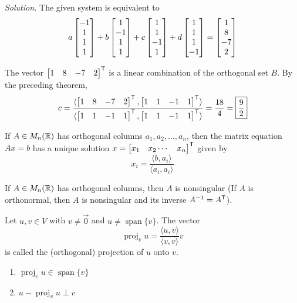 \begin{example}
\begin{enumerate}
    \textit{Solution.} The given system is equivalent to 
    $$a\begin{bmatrix} -1 \\ 1 \\ 1 \\ 1 \end{bmatrix} + b\begin{bmatrix} 1 \\ -1 \\ 1 \\ 1 \end{bmatrix} + c\begin{bmatrix} 1 \\ 1 \\ -1 \\ 1 \end{bmatrix} + d\begin{bmatrix} 1 \\ 1 \\ 1 \\ -1 \end{bmatrix} = \begin{bmatrix} 1 \\ 8 \\ -7 \\ 2 \end{bmatrix}$$

    The vector $\begin{bmatrix} 1 & 8 & -7 &2 \end{bmatrix}^{\mathsf{T}}$ is a linear combination of the orthogonal set $B$. By the preceding theorem,
    $$c = \frac{\langle\begin{bmatrix} 1 & 8 & -7 & 2 \end{bmatrix}^{\mathsf{T}}, \begin{bmatrix} 1 & 1 & -1 & 1 \end{bmatrix}^{\mathsf{T}}\rangle}{\langle\begin{bmatrix} 1 & 1 & -1 & 1 \end{bmatrix}^{\mathsf{T}}, \begin{bmatrix} 1 & 1 & -1 & 1 \end{bmatrix}^{\mathsf{T}}\rangle} = \frac{18}{4} = \boxed{\frac{9}{2}}$$
\end{enumerate}
\end{example}

\begin{remark}
If $A \in M_n(\mathbb{R})$ has orthogonal columns $a_1, a_2, \dots, a_n$, then the matrix equation $Ax = b$ has a unique solution $x = \begin{bmatrix} x_1 & x_2 \cdots & x_n \end{bmatrix}^{\mathsf{T}}$ given by
$$x_i = \frac{\langle b, a_i\rangle}{\langle a_i, a_i \rangle}$$
\end{remark}

\begin{theorem}
If $A \in M_n(\mathbb{R})$ has orthogonal columns, then $A$ is nonsingular (If $A$ is orthonormal, then $A$ is nonsingular and its inverse $A^{-1} = A^{\mathsf{T}}$).
\end{theorem}

\begin{definition}
Let $u, v \in V$ with $v \neq \vec{0}$ and $u \neq \operatorname{span}\{v\}$. The vector
$$\operatorname{proj}_vu = \frac{\langle u, v \rangle}{\langle v, v \rangle}v$$
is called the (orthogonal) projection of $u$ onto $v$.
\end{definition}

\begin{remark}
\leavevmode
\begin{enumerate}
    \item $\operatorname{proj}_vu \in \operatorname{span}\{v\}$
    \item $u - \operatorname{proj}_vu \perp v$
\end{enumerate}
\end{remark}

